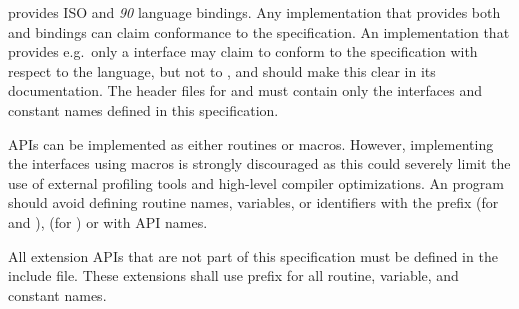 \openshmem provides ISO \Clang and \Fortran \textit{90} language bindings.
Any implementation that provides both \Clang and \Fortran bindings can claim
conformance to the specification. An implementation that provides e.g.\ only a
\Clang interface may claim to conform to the \openshmem specification with
respect to the \Clang language, but not to \Fortran, and should make this
clear in its documentation. The \openshmem header files for \Clang and
\Fortran must contain only the interfaces and constant names defined in this
specification.

\openshmem \ac{API}s can be implemented as either routines or macros. However,
implementing the interfaces using macros is strongly discouraged as this could
severely limit the use of external profiling tools and high-level compiler
optimizations. An \openshmem program should avoid defining routine names,
variables, or identifiers with the prefix \shmemprefix (for \Clang and
\Fortran), \shmemprefixC (for \Clang) or with \openshmem \ac{API} names.

All \openshmem extension \ac{API}s that are not part of this specification must
be defined in the  include file. These extensions shall use
 prefix for all routine, variable, and constant names.
